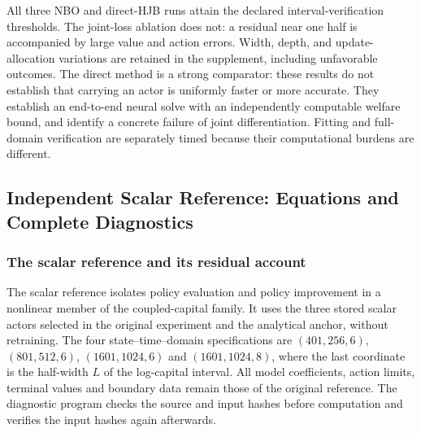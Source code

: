 All three NBO and direct-HJB runs attain the declared interval-verification thresholds. The joint-loss ablation does not: a residual near one half is accompanied by large value and action errors. Width, depth, and update-allocation variations are retained in the supplement, including unfavorable outcomes. The direct method is a strong comparator: these results do not establish that carrying an actor is uniformly faster or more accurate. They establish an end-to-end neural solve with an independently computable welfare bound, and identify a concrete failure of joint differentiation. Fitting and full-domain verification are separately timed because their computational burdens are different.
\subsection{Independent Scalar Reference: Equations and Complete Diagnostics}\label{app:r14reference}

\subsubsection{The scalar reference and its residual account}
\label{sec:r14-scalar-account}

The scalar reference isolates policy evaluation and policy improvement in a
nonlinear member of the coupled-capital family. It uses the three stored scalar
actors selected in the original experiment and the analytical anchor, without
retraining. The four state--time--domain specifications are
$(401,256,6)$, $(801,512,6)$, $(1601,1024,6)$ and $(1601,1024,8)$, where the
last coordinate is the half-width $L$ of the log-capital interval. All model
coefficients, action limits, terminal values and boundary data remain those
of the original reference. The diagnostic program checks the source and input
hashes before computation and verifies the input hashes again afterwards.

